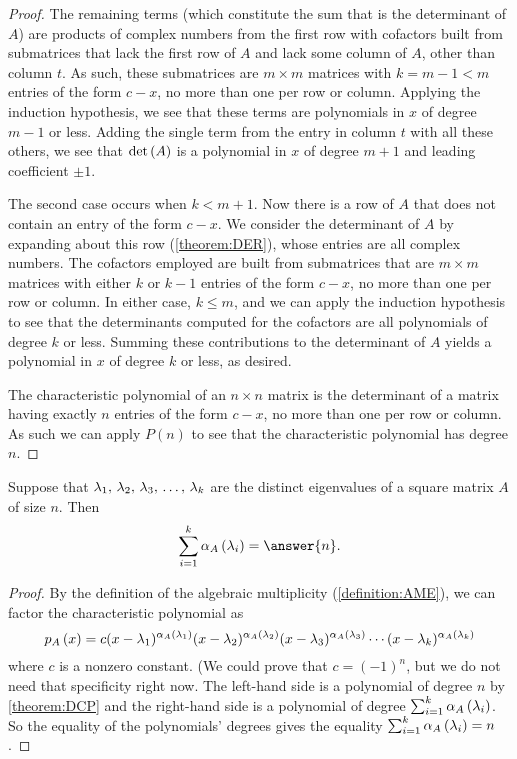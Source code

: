\documentclass{ximera}
\begin{document}
\begin{theorem}
\begin{proof}
  The remaining terms (which constitute the sum that is the
  determinant of $A$) are products of complex numbers from the first
  row with cofactors built from submatrices that lack the first row of
  $A$ and lack some column of $A$, other than column $t$.  As such,
  these submatrices are $m\times m$ matrices with $k=m-1<m$ entries of
  the form $c-x$, no more than one per row or column.  Applying the
  induction hypothesis, we see that these terms are polynomials in $x$
  of degree $m-1$ or less.  Adding the single term from the entry in
  column $t$ with all these others, we see that $\det\left(A\right)$ is a
  polynomial in $x$ of degree $m+1$ and leading coefficient $\pm 1$.


  The second case occurs when $k<m+1$.  Now there is a row of $A$ that
  does not contain an entry of the form $c-x$.  We consider the
  determinant of $A$ by expanding about this row (\ref{theorem:DER}),
  whose entries are all complex numbers.  The cofactors employed are
  built from submatrices that are $m\times m$ matrices with either $k$
  or $k-1$ entries of the form $c-x$, no more than one per row or
  column.  In either case, $k\leq m$, and we can apply the induction
  hypothesis to see that the determinants computed for the cofactors
  are all polynomials of degree $k$ or less.  Summing these
  contributions to the determinant of $A$ yields a polynomial in $x$
  of degree $k$ or less, as desired.

  The characteristic polynomial of an $n\times n$ matrix is the
  determinant of a matrix having exactly $n$ entries of the form
  $c-x$, no more than one per row or column.  As such we can apply
  $P(n)$ to see that the characteristic polynomial has degree $n$.
\end{proof}
\end{theorem}

\begin{theorem}
\label{theorem:NEM}

Suppose that ${\lambda}_{1},\,{\lambda}_{2},\,{\lambda}_{3},\,\ldots,\,{\lambda}_{k}$ are the distinct eigenvalues of
a square matrix $A$ of size $n$.  Then
\[
  \sum_{i=1}^{k}\algmult{A}{\lambda_i}=\answer{n}.
\]

\begin{proof}
  By the definition of the algebraic multiplicity (\ref{definition:AME}), we can factor the characteristic polynomial as
\[
  p_{A}\left(x\right)=c(x-\lambda_1)^{\alpha_{A}\left(\lambda_1\right)}(x-\lambda_2)^{\alpha_{A}\left(\lambda_2\right)}(x-\lambda_3)^{\alpha_{A}\left(\lambda_3\right)}\cdots(x-\lambda_k)^{\alpha_{A}\left(\lambda_k\right)}
\]
where $c$ is a nonzero constant.  (We could prove that $c=(-1)^{n}$,
but we do not need that specificity right now.  The left-hand side is
a polynomial of degree $n$ by \ref{theorem:DCP} and the right-hand
side is a polynomial of degree $\sum_{i=1}^{k}\alpha_{A}\left(\lambda_i\right)$.
So the equality of the polynomials' degrees gives the equality
$\sum_{i=1}^{k}\alpha_{A}\left(\lambda_i\right)=n$.
\end{proof}
\end{theorem}
\end{document}
